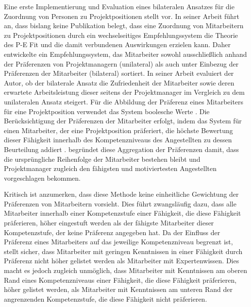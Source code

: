 Eine erste Implementierung und Evaluation eines bilateralen Ansatzes für die Zuordnung von Personen zu Projektpositionen stellt \textcite[S. 1ff.]{link:booklet} vor.
In seiner Arbeit führt \textcite[S. 2]{link:booklet} an, dass bislang keine Publikation belegt, dass eine Zuordnung von Mitarbeitern zu Projektpositionen durch ein wechselseitiges Empfehlungssystem die Theorie des \ac{P-E Fit} und die damit verbundenen Auswirkungen erzielen kann.
Daher entwickelte \textcite[S. 1ff.]{link:booklet} ein Empfehlungssystem, das Mitarbeiter sowohl ausschließlich anhand der Präferenzen von Projektmanagern (unilateral) als auch unter Einbezug der Präferenzen der Mitarbeiter (bilateral) sortiert.
In seiner Arbeit evaluiert der Autor, ob der bilaterale Ansatz die Zufriedenheit der Mitarbeiter sowie deren erwartete Arbeitsleistung dieser seitens der Projektmanager im Vergleich zu dem unilateralen Ansatz steigert.
Für die Abbildung der Präferenz eines Mitarbeiters für eine Projektposition verwendet das System boolesche Werte \cite[S. 69]{link:booklet}.
Die Berücksichtigung der Präferenzen der Mitarbeiter erfolgt, indem das System für einen Mitarbeiter, der eine Projektposition präferiert, die höchste Bewertung dieser Fähigkeit innerhalb des Kompetenzniveaus des Angestellten zu dessen Beurteilung addiert \cite[S. 44]{link:booklet}.
\textcite[S. 44]{link:booklet} begründet diese Aggregation der Präferenzen damit, dass die ursprüngliche Reihenfolge der Mitarbeiter bestehen bleibt und Projektmanager zugleich den fähigsten und motiviertesten Angestellten vorgeschlagen bekommen.

Kritisch ist anzumerken, dass diese Methode keine einheitliche Gewichtung der Präferenzen von Mitarbeitern vorsieht.
Dies führt zwangsläufig dazu, dass alle Mitarbeiter innerhalb einer Kompetenzstufe einer Fähigkeit, die diese Fähigkeit präferieren, höher eingestuft werden als der fähigste Mitarbeiter dieser Kompetenzstufe, der keine Präferenz angegeben hat.
Da der Einfluss der Präferenz eines Mitarbeiters auf das jeweilige Kompetenzniveau begrenzt ist, stellt \textcite[S. 44]{link:booklet} sicher, dass Mitarbeiter mit geringen Kenntnissen in einer Fähigkeit durch Präferenz nicht höher gelistet werden als Mitarbeiter mit Expertenwissen.
Dies macht es jedoch zugleich unmöglich, dass Mitarbeiter mit Kenntnissen am oberen Rand eines Kompetenzniveaus einer Fähigkeit, die diese Fähigkeit präferieren, höher gelistet werden, als Mitarbeiter mit Kenntnissen am unteren Rand der angrenzenden Kompetenzstufe, die diese Fähigkeit nicht präferieren.

